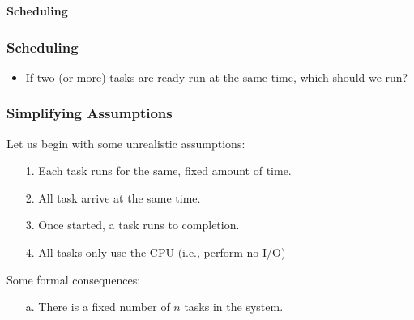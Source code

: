 \begin{frame}

\begin{center}

\Huge \textbf{Scheduling}

\end{center}

\end{frame}


\begin{frame}

\frametitle{Scheduling}

\begin{itemize}


\item If two (or more) tasks are ready run at the same time, which should we run?

\end{itemize}

\end{frame}


\begin{frame}

\frametitle{Simplifying Assumptions}

Let us begin with some unrealistic assumptions:

\begin{itemize}

\item[1.] Each task runs for the same, fixed amount of time.

\item[2.] All task arrive at the same time.

\item[3.] Once started, a task runs to completion.

\item[4.] All tasks only use the CPU (i.e., perform no I/O)


\end{itemize}

\vspace{\fill}

Some formal consequences:

\begin{itemize}

\item[a.] There is a fixed number of $n$ tasks in the system.

\end{itemize}

\end{frame}


